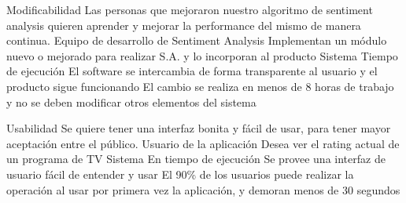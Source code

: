\begin{enumerate}
\QA
  {Modificabilidad} %
  {Las personas que mejoraron nuestro algoritmo de sentiment analysis quieren aprender y mejorar la performance del mismo de manera continua.} %
  {Equipo de desarrollo de Sentiment Analysis} %
  {Implementan un módulo nuevo o mejorado para realizar S.A. y lo incorporan al producto} %
  {Sistema} %
  {Tiempo de ejecución} %
  {El software se intercambia de forma transparente al usuario y el producto sigue funcionando} %
  {El cambio se realiza en menos de 8 horas de trabajo y no se deben modificar otros elementos del sistema} %



\QA
  {Usabilidad} %
  {Se quiere tener una interfaz bonita y fácil de usar, para tener mayor aceptación entre el público.} %
  {Usuario de la aplicación} %
  {Desea ver el rating actual de un programa de TV} %
  {Sistema} %
  {En tiempo de ejecución} %
  {Se provee una interfaz de usuario fácil de entender y usar} %
  {El 90\% de los usuarios puede realizar la operación al usar por primera vez la aplicación, y demoran menos de 30 segundos} %
  

\end{enumerate}

